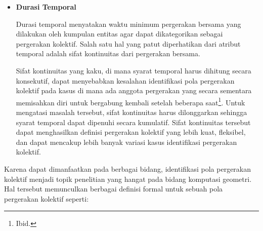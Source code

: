 \documentclass[a4paper,twoside]{article}
\begin{document}
\begin{itemize}[noitemsep, nolistsep]
    \textit{Size} menyatakan jumlah entitas minimum yang bergerak bersama agar entitas-entitas tersebut dapat diidentifikasi sebagai sebuah pergerakan kolektif. Walaupun dua buah entitas dapat membentuk sebuah pergerakan kolektif, namun jumlah entitas minimum untuk membentuk sebuah pergerakan kolektif dapat disesuaikan oleh peneliti berdasarkan tujuan dan kebutuhan penelitian\footnote{Wiratma, L. (2019) Computations and Measures of Collective Movement Patterns Based on Trajectory Data. Disertasi. Utrecht University, Netherlands, Netherlands}. Selain jumlah entitas, peneliti juga harus mempertimbangkan apakah satu entitas dapat tergabung dalam lebih dari satu pergerakan kolektif atau tidak.
    
    \item \textbf{Durasi Temporal}
    
    Durasi temporal menyatakan waktu minimum pergerakan bersama yang dilakukan oleh kumpulan entitas agar dapat dikategorikan sebagai pergerakan kolektif. Salah satu hal yang patut diperhatikan dari atribut temporal adalah sifat kontinuitas dari pergerakan bersama.
    
    Sifat kontinuitas yang kaku, di mana syarat temporal harus dihitung secara konsekutif, dapat menyebabkan kesalahan identifikasi pola pergerakan kolektif pada kasus di mana ada anggota pergerakan yang secara sementara memisahkan diri untuk bergabung kembali setelah beberapa saat\footnote{Ibid.}. Untuk mengatasi masalah tersebut, sifat kontinuitas harus dilonggarkan sehingga syarat temporal dapat dipenuhi secara kumulatif. Sifat kontinuitas tersebut dapat menghasilkan definisi pergerakan kolektif yang lebih kuat, fleksibel, dan dapat mencakup lebih banyak variasi kasus identifikasi pergerakan kolektif.
\end{itemize}

Karena dapat dimanfaatkan pada berbagai bidang, identifikasi pola pergerakan kolektif menjadi topik penelitian yang hangat pada bidang komputasi geometri. Hal tersebut memunculkan berbagai definisi formal untuk sebuah pola pergerakan kolektif seperti:
\end{document}
